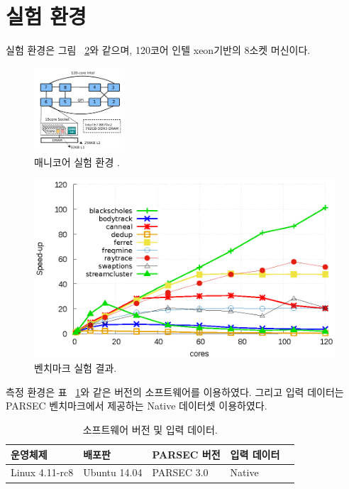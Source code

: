 \documentclass{kcc}
\begin{document}
\section{실험 환경}

실험 환경은 그림 ~\ref{fig:parsec}와 같으며, 120코어 인텔 xeon기반의 8소켓 머신이다. 
\begin{figure}[h]
  \begin{center}
     \includegraphics[width=0.3\textwidth]{fig/xeon}
  \end{center}
  \caption{매니코어 실험 환경 .}
  \label{fig:xeon}
\end{figure}

\begin{figure}[tb!]
    \centering
    \includegraphics[width=4.8in]{graph/PARSEC.eps}
    \caption{벤치마크 실험 결과.}
    \label{fig:parsec}
\end{figure}

측정 환경은 표 ~\ref{tab:config}와 같은 버전의 소프트웨어를 이용하였다. 
그리고 입력 데이터는 PARSEC 벤치마크에서 제공하는 Native 데이터셋 이용하였다.

\begin{table}[h!]
  \caption{소프트웨어 버전 및 입력 데이터.}
  \centering
  \small
  \begin{tabular}{l l l l l} \toprule
    운영체제 & 배포판 & PARSEC 버전 & 입력 데이터\\
    \midrule
    Linux 4.11-rc8 & Ubuntu 14.04 & PARSEC 3.0 & Native & \\
    \bottomrule
  \end{tabular}
  \label{tab:config}
\end{table}
\end{document}
